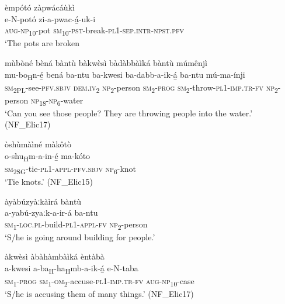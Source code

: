 \ea
\label{bkm:Ref75176574}
èmpótó zàpwácáùkì\\
\gll e-N-potó    zi-a-pwac-á̲-uk-i\\
\textsc{aug}-\textsc{np}\textsubscript{10}-pot  \textsc{sm}\-\textsubscript{10}-\textsc{pst}-break-\textsc{pl}1-\textsc{sep}.\textsc{intr}-\textsc{npst}.\textsc{pfv}\\
\glt ‘The pots are broken
\z

\ea
\label{bkm:Ref75176639}
mùbòné bèná bàntù bàkwèsì bàdàbbàìká bàntù múmênjì\\
\gll mu-bo\textsubscript{H}n-é̲    bená    ba-ntu ba-kwesi  ba-dabb-a-ik-á̲    ba-ntu  mú-ma-ínji\\
\textsc{sm}\textsubscript{2PL}-see-\textsc{pfv}.\textsc{sbjv}  \textsc{dem}.\textsc{iv}\textsubscript{2}  \textsc{np}\textsubscript{2}-person
\textsc{sm}\textsubscript{2}-\textsc{prog}  \textsc{sm}\textsubscript{2}-throw-\textsc{pl}1-\textsc{imp}.\textsc{tr}-\textsc{fv}  \textsc{np}\textsubscript{2}-person  \textsc{np}\textsubscript{18}-\textsc{np}\textsubscript{6}-water\\
\glt ‘Can you see those people? They are throwing people into the water.’ (NF\_Elic17)
\z

\ea
\label{bkm:Ref75176640}
òshùmàìné màkôtò\\
\gll o-shu\textsubscript{H}m-a-in-é̲      ma-kóto\\
\textsc{sm}\textsubscript{2SG}-tie-\textsc{pl}1-\textsc{appl}-\textsc{pfv}.\textsc{sbjv}  \textsc{np}\textsubscript{6}-knot\\
\glt ‘Tie knots.’ (NF\_Elic15)
\z

\ea
\label{bkm:Ref490492423}
àyàbúzyàːkàìrá bàntù\\
\gll a-yabú-zyaːk-a-ir-á      ba-ntu\\
\textsc{sm}\textsubscript{1}-\textsc{loc}.\textsc{pl}-build-\textsc{pl}1-\textsc{appl}-\textsc{fv}  \textsc{np}\textsubscript{2}-person\\
\glt ‘S/he is going around building for people.’
\z

\ea
\label{bkm:Ref75176679}
àkwèsì àbàhàmbàìká èntàbà\\
\gll a-kwesi  a-ba\textsubscript{H}-ha\textsubscript{H}mb-a-ik-á̲    e-N-taba\\
\textsc{sm}\textsubscript{1}-\textsc{prog}  \textsc{sm}\textsubscript{1}-\textsc{om}\textsubscript{2}-accuse-\textsc{pl}1-\textsc{imp}.\textsc{tr}-\textsc{fv}  \textsc{aug}-\textsc{np}\textsubscript{10}-case\\
\glt ‘S/he is accusing them of many things.’ (NF\_Elic17)
\z

